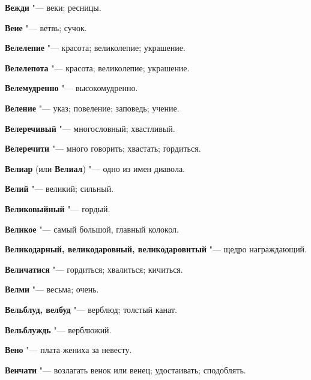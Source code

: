 \begin{mymulticols}{2}
\noindent\textbf{Вежди} "--- веки; ресницы. 




\noindent\textbf{Веие} "--- ветвь; сучок. 




\noindent\textbf{Велелепие} "--- красота; великолепие; украшение. 




\noindent\textbf{Велелепота} "--- красота; великолепие; украшение. 




\noindent\textbf{Велемудренно} "--- высокомудренно. 




\noindent\textbf{Веление} "--- указ; повеление; заповедь; учение. 




\noindent\textbf{Велеречивый} "--- многословный; хвастливый. 




\noindent\textbf{Велеречити} "--- много говорить; хвастать; гордиться. 




\noindent\textbf{Велиар} (или \textbf{Велиал}) "--- одно из имен диавола. 




\noindent\textbf{Велий} "--- великий; сильный. 




\noindent\textbf{Великовыйный} "--- гордый. 




\noindent\textbf{Великое} "--- самый большой, главный колокол. 




\noindent\textbf{Великодарный, великодаровный, великодаровитый} "--- щедро награждающий. 




\noindent\textbf{Величатися} "--- гордиться; хвалиться; кичиться. 




\noindent\textbf{Велми} "--- весьма; очень. 




\noindent\textbf{Вельблуд, велбуд} "--- верблюд; толстый канат. 




\noindent\textbf{Вельблуждь} "--- верблюжий. 




\noindent\textbf{Вено} "--- плата жениха за невесту. 




\noindent\textbf{Венчати} "--- возлагать венок или венец; удостаивать; сподоблять. 





\end{mymulticols}
